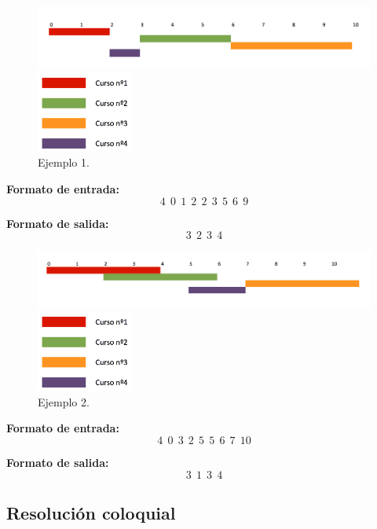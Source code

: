 \begin{figure}[H] %
\begin{center}
\includegraphics[width=460pt]{../imgs/ejemplo1ej2.png}
\end{center}
\includegraphics[width=90pt]{../imgs/leyendaej2.png}
\caption{Ejemplo 1.}
\end{figure}

\textbf{Formato de entrada:} $$4\ \ 0\ \ 1\ \ 2\ \ 2\ \ 3\ \ 5\ \ 6\ \ 9$$

\textbf{Formato de salida:} $$3\ \ 2\ \ 3\ \ 4$$


\begin{figure}[H] %
\begin{center}
\includegraphics[width=480pt]{../imgs/ejemplo2ej2.png}
\end{center}
\includegraphics[width=90pt]{../imgs/leyendaej2.png}
\caption{Ejemplo 2.}
\end{figure}

\textbf{Formato de entrada:} $$4\ \ 0\ \ 3\ \ 2\ \ 5\ \ 5\ \ 6\ \ 7\ \ 10$$

\textbf{Formato de salida:} $$3\ \ 1\ \ 3\ \ 4$$



\subsection{Resolución coloquial}

